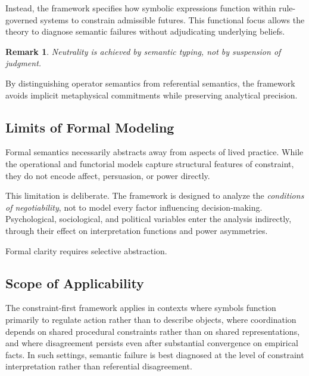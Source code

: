 \documentclass[11pt]{article}
\newtheorem{remark}{Remark}
\begin{document}
Instead, the framework specifies how symbolic expressions function within
rule-governed systems to constrain admissible futures. This functional focus
allows the theory to diagnose semantic failures without adjudicating underlying
beliefs.

\begin{remark}
Neutrality is achieved by semantic typing, not by suspension of judgment.
\end{remark}

By distinguishing operator semantics from referential semantics, the framework
avoids implicit metaphysical commitments while preserving analytical precision.

\subsection{Limits of Formal Modeling}

Formal semantics necessarily abstracts away from aspects of lived practice.
While the operational and functorial models capture structural features of
constraint, they do not encode affect, persuasion, or power directly.

This limitation is deliberate. The framework is designed to analyze the
\emph{conditions of negotiability}, not to model every factor influencing
decision-making. Psychological, sociological, and political variables enter the
analysis indirectly, through their effect on interpretation functions and power
asymmetries.

Formal clarity requires selective abstraction.

\subsection{Scope of Applicability}

The constraint-first framework applies in contexts where symbols function
primarily to regulate action rather than to describe objects, where coordination
depends on shared procedural constraints rather than on shared representations,
and where disagreement persists even after substantial convergence on empirical
facts. In such settings, semantic failure is best diagnosed at the level of
constraint interpretation rather than referential disagreement.
\end{document}
